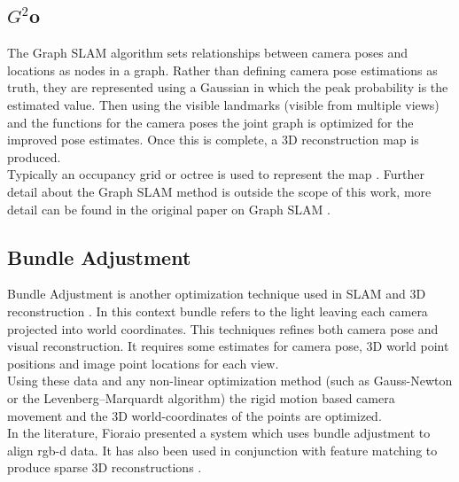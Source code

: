 
\subsection{$G^2$o}
\label{Sec:G20}
The Graph SLAM algorithm sets relationships between camera poses and locations as nodes in a graph. Rather than defining camera pose estimations as truth, they are represented using a Gaussian in which the peak probability is the estimated value. Then using the visible landmarks (visible from multiple views) and the functions for the camera poses the joint graph is optimized for the improved pose estimates. Once this is complete, a 3D reconstruction map is produced. \\

Typically an occupancy grid or octree is used to represent the map \cite{Wurm10Octomap}. Further detail about the Graph SLAM method is outside the scope of this work, more detail can be found in the original paper on Graph SLAM \cite{Kummerle11G}. \\

\subsection{Bundle Adjustment}

Bundle Adjustment is another optimization technique used in SLAM and 3D reconstruction \cite{Lourakis09Sba}. In this context bundle refers to the light leaving each camera projected into world coordinates. This techniques refines both camera pose and visual reconstruction. It requires some estimates for camera pose, 3D world point positions and image point locations for each view. \\

Using these data and any non-linear optimization method (such as Gauss-Newton or the Levenberg–Marquardt algorithm) the rigid motion based camera movement and the 3D world-coordinates of the points are optimized. \\

In the literature, Fioraio \cite{Fioraio11Realtime} presented a system which uses bundle adjustment to align rgb-d data. It has also been used in conjunction with feature matching to produce sparse 3D reconstructions \cite{Klein07Parallel,Agarwal09Building}.
